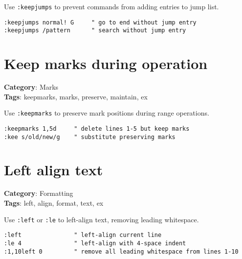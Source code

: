 {{{{{Use {\footnotesize \Verb§:keepjumps§} to prevent commands from adding entries to jump list.

\begin{Exa*}{}
\begin{Verbatim}[fontsize=\footnotesize, breaklines, breakanywhere]
:keepjumps normal! G     " go to end without jump entry
:keepjumps /pattern      " search without jump entry
\end{Verbatim}
\end{Exa*}

\section{Keep marks during operation}

\textbf{Category}: Marks\\ \textbf{Tags}: keepmarks, marks, preserve, maintain, ex
\vspace{0.5cm}

Use {\footnotesize \Verb§:keepmarks§} to preserve mark positions during range operations.

\begin{Exa*}{}
\begin{Verbatim}[fontsize=\footnotesize, breaklines, breakanywhere]
:keepmarks 1,5d     " delete lines 1-5 but keep marks
:kee s/old/new/g    " substitute preserving marks
\end{Verbatim}
\end{Exa*}

\section{Left align text}

\textbf{Category}: Formatting\\ \textbf{Tags}: left, align, format, text, ex
\vspace{0.5cm}

Use {\footnotesize \Verb§:left§} or {\footnotesize \Verb§:le§} to left-align text, removing leading whitespace.

\begin{Exa*}{}
\begin{Verbatim}[fontsize=\footnotesize, breaklines, breakanywhere]
:left               " left-align current line
:le 4               " left-align with 4-space indent
:1,10left 0         " remove all leading whitespace from lines 1-10
\end{Verbatim}
\end{Exa*}

}}}}}

